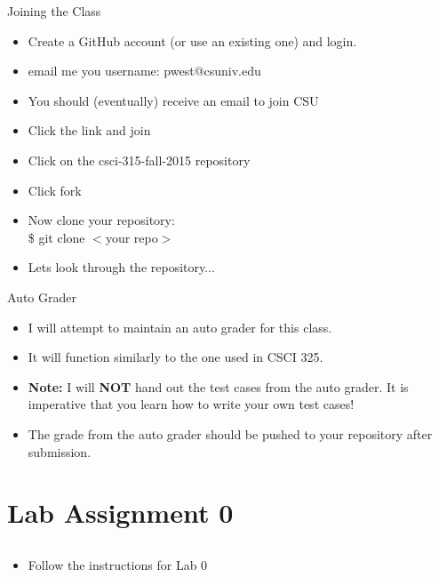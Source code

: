 \documentclass{beamer}
\begin{document}
\begin{frame}{Joining the Class}
\begin{itemize}
\item Create a GitHub account (or use an existing one) and login.
\item email me you username: pwest@csuniv.edu
\item You should (eventually) receive an email to join CSU
\item Click the link and join
\item Click on the csci-315-fall-2015 repository
\item Click fork
\item Now clone your repository:\\
\$ git clone $<$your repo$>$
\item Lets look through the repository...
\end{itemize}
\end{frame}

\begin{frame}{Auto Grader}
\begin{itemize}
\item I will attempt to maintain an auto grader for this class.
\item It will function similarly to the one used in CSCI 325.
\item \textbf{Note:} I will \textbf{NOT} hand out the test cases from the auto grader.  It is imperative that you learn how to write your own test cases!
\item The grade from the auto grader should be pushed to your repository after submission.
\end{itemize}
\end{frame}

\section{Lab Assignment 0}
\subsection{}
\begin{frame}{}
\begin{itemize}
\item Follow the instructions for Lab 0
\end{itemize}
\end{frame}
\end{document}
